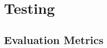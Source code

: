 \textcolor{dimgray}{\lipsum}


\section{Testing}
\label{sec:testing}

\textcolor{dimgray}{\lipsum[1-15]}


\subsection{Evaluation Metrics}
\label{subsec:evaluation-metrics}

\textcolor{dimgray}{\lipsum}

